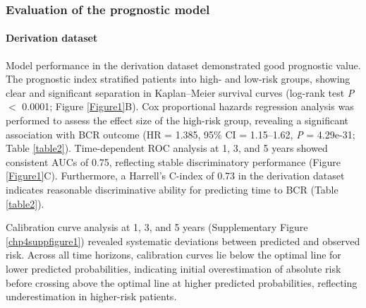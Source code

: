 \subsubsection{Evaluation of the prognostic model}
\paragraph{Derivation dataset}
Model performance in the derivation dataset demonstrated good prognostic value. The prognostic index stratified patients into high- and low-risk groups, showing clear and significant separation in Kaplan–Meier survival curves (log-rank test \textit{P} $<$ 0.0001; Figure \ref{Figure1}B). Cox proportional hazards regression analysis was performed to assess the effect size of the high-risk group, revealing a significant association with BCR outcome (HR = 1.385, 95\% CI = 1.15–1.62, \textit{P} = 4.29e-31; Table \ref{table2}). Time-dependent ROC analysis at 1, 3, and 5 years showed consistent AUCs of 0.75, reflecting stable discriminatory performance (Figure \ref{Figure1}C). Furthermore, a Harrell’s C-index of 0.73 in the derivation dataset indicates reasonable discriminative ability for predicting time to BCR (Table \ref{table2}). 

Calibration curve analysis at 1, 3, and 5 years (Supplementary Figure \ref{chp4suppfigure1}) revealed systematic deviations between predicted and observed risk. Across all time horizons, calibration curves lie below the optimal line for lower predicted probabilities, indicating initial overestimation of absolute risk before crossing above the optimal line at higher predicted probabilities, reflecting underestimation in higher-risk patients.


